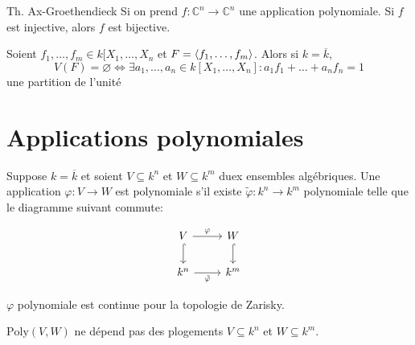 \begin{theorem}{Th. Ax-Groethendieck}
    Si on prend \(f : \mathbb{C}^{n} \to \mathbb{C}^{n}\) une application
    polynomiale. Si \(f\) est injective, alors \(f\) est bijective.
\end{theorem}


\begin{remark}{}
    Soient \(f_{1}, \dots, f_{m} \in k[X_{1}, \dots, X_{n}\) et \(F =
    {\left\langle f_{1}, \dots, f_{m}\right\rangle} \). Alors si \(k = \overline{k}\), 
    \[
      V{(F)} = \varnothing \iff \exists a_{1}, \dots, a_{n} \in k[X_{1} , \dots,
      X_{n}] : a_{1} f_{1} + \dots + a_{n} f_{n} = 1
    \]
    une partition de l'unité
\end{remark}

\section{Applications polynomiales}

\begin{definition}{}
    Suppose \(k = \overline{k}\) et soient \(V \subseteq k^{n} \) et \(W
    \subseteq k^{m} \) duex ensembles algébriques. Une application \(\varphi  :
    V \to W\) est polynomiale s'il existe \(\tilde{\varphi} : k^{n} \to k^{m}\)
    polynomiale telle que le diagramme suivant commute:
    
\[
\begin{tikzcd}
	V & W \\
	{k^n} & {k^m}
	\arrow["\varphi", from=1-1, to=1-2]
	\arrow[hook, from=1-1, to=2-1]
	\arrow[hook, from=1-2, to=2-2]
	\arrow["{\tilde{\varphi}}"', from=2-1, to=2-2]
\end{tikzcd}
\]
\end{definition}


\begin{eser}{}
    \(\varphi \) polynomiale est continue pour la topologie de Zarisky.
\end{eser}


\begin{proposition}{}
    \(\mathrm{Poly}{(V, W)}\) ne dépend pas des plogements \(V \subseteq k^{n}
    \) et \(W \subseteq k^{m} \).
\end{proposition}

